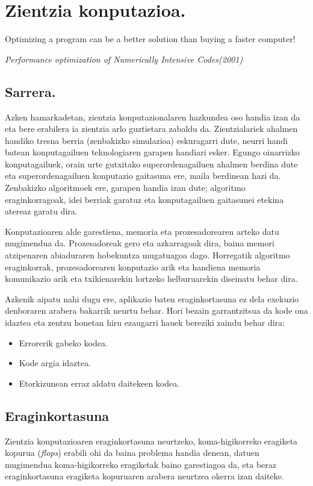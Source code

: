 \chapter{Zientzia konputazioa.}

\epigraph{Optimizing a program can be a better solution than buying a faster computer!}
{\textit {Performance optimization of Numerically Intensive Codes(2001)}}

\section{Sarrera.}

Azken hamarkadetan, zientzia konputazionalaren hazkundea oso handia izan da eta bere erabilera ia zientzia arlo guztietara zabaldu da. Zientzialariek ahalmen handiko tresna berria (zenbakizko simulazioa) eskuragarri dute, neurri handi batean konputagailuen teknologiaren garapen handiari esker. Egungo oinarrizko konputagailuek, orain urte gutxitako superordenagailuen ahalmen berdina dute eta superordenagailuen konputazio gaitasuna ere, maila berdinean hazi da. Zenbakizko algoritmoek ere, garapen handia izan dute; algoritmo eraginkorragoak, idei berriak garatuz eta konputagailuen gaitasunei etekina atereaz garatu dira.

Konputazioaren alde garestiena, memoria eta prozesadorearen arteko datu mugimendua da. Prozesadoreak gero eta azkarragoak dira, baina memori atzipenaren abiaduraren hobekuntza mugatuagoa dago. Horregatik algoritmo eraginkorrak, prozesadorearen konputazio arik eta handiena  memoria komunikazio arik eta txikienarekin lortzeko helburuarekin  diseinatu behar dira.      
 
Azkenik aipatu nahi dugu ere, aplikazio baten eraginkortasuna ez dela exekuzio denboraren arabera bakarrik neurtu behar. Hori bezain garrantzitsua da kode ona idaztea \cite{Wilson2014} eta zentzu honetan hiru ezaugarri hauek bereziki zaindu behar dira:
\begin{itemize}
\item Errorerik gabeko kodea.
\item Kode argia idaztea.
\item Etorkizunean erraz aldatu daitekeen kodea.
\end{itemize}


\section{Eraginkortasuna}

Zientzia konputazioaren eraginkortasuna neurtzeko, koma-higikorreko eragiketa kopurua (\emph{flops}) erabili ohi da baina problema handia denean, datuen mugimendua koma-higikorreko eragiketak baino garestiagoa da, eta beraz eraginkortasuna eragiketa kopuruaren arabera neurtzea okerra izan daiteke. 

